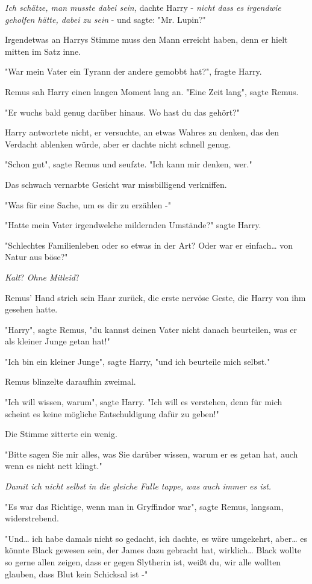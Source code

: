 {\emph{Ich schätze, man musste dabei sein,} dachte Harry - \emph{nicht dass es irgendwie geholfen hätte, dabei zu sein} - und sagte: "Mr. Lupin?"

Irgendetwas an Harrys Stimme muss den Mann erreicht haben, denn er hielt mitten im Satz inne.

"War mein Vater ein Tyrann der andere gemobbt hat?", fragte Harry.

Remus sah Harry einen langen Moment lang an. "Eine Zeit lang", sagte Remus.

"Er wuchs bald genug darüber hinaus. Wo hast du das gehört?"

Harry antwortete nicht, er versuchte, an etwas Wahres zu denken, das den Verdacht ablenken würde, aber er dachte nicht schnell genug.

"Schon gut", sagte Remus und seufzte. "Ich kann mir denken, wer."

Das schwach vernarbte Gesicht war missbilligend verkniffen.

"Was für eine Sache, um es dir zu erzählen -"

"Hatte mein Vater irgendwelche mildernden Umstände?" sagte Harry.

"Schlechtes Familienleben oder so etwas in der Art? Oder war er einfach… von Natur aus böse?"

\emph{Kalt}? \emph{Ohne Mitleid}?

Remus' Hand strich sein Haar zurück, die erste nervöse Geste, die Harry von ihm gesehen hatte.

"Harry", sagte Remus, "du kannst deinen Vater nicht danach beurteilen, was er als kleiner Junge getan hat!"

"Ich bin ein kleiner Junge", sagte Harry, "und ich beurteile mich selbst."

Remus blinzelte daraufhin zweimal.

"Ich will wissen, warum", sagte Harry. "Ich will es verstehen, denn für mich scheint es keine mögliche Entschuldigung dafür zu geben!"

Die Stimme zitterte ein wenig.

"Bitte sagen Sie mir alles, was Sie darüber wissen, warum er es getan hat, auch wenn es nicht nett klingt."

\emph{Damit ich nicht selbst in die gleiche Falle tappe, was auch immer es ist.}

"Es war das Richtige, wenn man in Gryffindor war", sagte Remus, langsam, widerstrebend.

"Und… ich habe damals nicht so gedacht, ich dachte, es wäre umgekehrt, aber… es könnte Black gewesen sein, der James dazu gebracht hat, wirklich… Black wollte so gerne allen zeigen, dass er gegen Slytherin ist, weißt du, wir alle wollten glauben, dass Blut kein Schicksal ist -"

}
